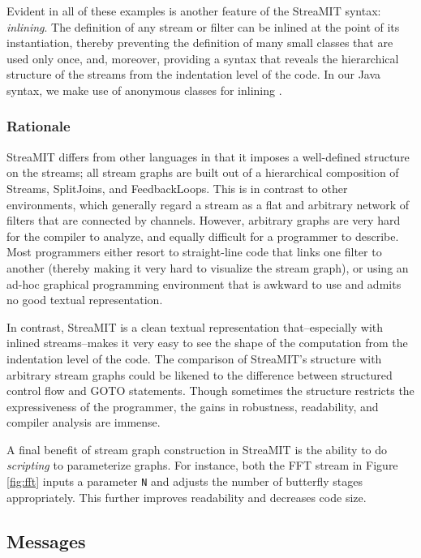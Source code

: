 Evident in all of these examples is another feature of the StreaMIT
syntax: {\it inlining}.  The definition of any stream or filter can be
inlined at the point of its instantiation, thereby preventing the
definition of many small classes that are used only once, and,
moreover, providing a syntax that reveals the hierarchical structure
of the streams from the indentation level of the code.  In our Java
syntax, we make use of anonymous classes for inlining \cite{java}.

\subsubsection{Rationale}

StreaMIT differs from other languages in that it imposes a
well-defined structure on the streams; all stream graphs are built out
of a hierarchical composition of Streams, SplitJoins, and
FeedbackLoops.  This is in contrast to other environments, which
generally regard a stream as a flat and arbitrary network of filters
that are connected by channels.  However, arbitrary graphs are very
hard for the compiler to analyze, and equally difficult for a
programmer to describe.  Most programmers either resort to
straight-line code that links one filter to another (thereby making it
very hard to visualize the stream graph), or using an ad-hoc graphical
programming environment that is awkward to use and admits no good
textual representation.

In contrast, StreaMIT is a clean textual representation
that--especially with inlined streams--makes it very easy to see the
shape of the computation from the indentation level of the code.  The
comparison of StreaMIT's structure with arbitrary stream graphs could
be likened to the difference between structured control flow and GOTO
statements.  Though sometimes the structure restricts the
expressiveness of the programmer, the gains in robustness,
readability, and compiler analysis are immense.

A final benefit of stream graph construction in StreaMIT is the
ability to do {\it scripting} to parameterize graphs.  For instance,
both the FFT stream in Figure \ref{fig:fft} inputs a parameter {\tt N}
and adjusts the number of butterfly stages appropriately.  This
further improves readability and decreases code size.

\subsection{Messages}

